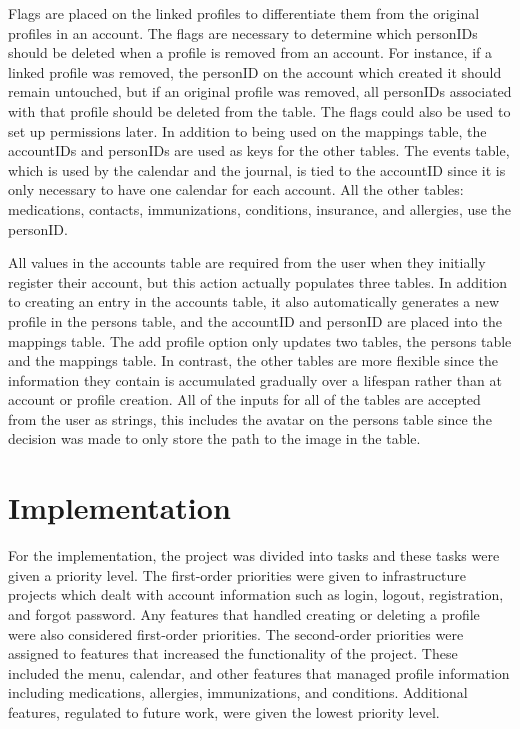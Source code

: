 \documentclass[twocolumn,12pt]{article}
\begin{document}
Flags are placed on the linked profiles to differentiate them from the original profiles in an account. The flags are necessary to determine which personIDs should be deleted when a profile is removed from an account. For instance, if a linked profile was removed, the personID on the account which created it should remain untouched, but if an original profile was removed, all personIDs associated with that profile should be deleted from the table. The flags could also be used to set up permissions later. In addition to being used on the mappings table, the accountIDs and personIDs are used as keys for the other tables. The events table, which is used by the calendar and the journal, is tied to the accountID since it is only necessary to have one calendar for each account. All the other tables: medications, contacts, immunizations, conditions, insurance, and allergies, use the personID.

All values in the accounts table are required from the user when they initially register their account, but this action actually populates three tables. In addition to creating an entry in the accounts table, it also automatically generates a new profile in the persons table, and the accountID and personID are placed into the mappings table. The add profile option only updates two tables, the persons table and the mappings table. In contrast, the other tables are more flexible since the information they contain is accumulated gradually over a lifespan rather than at account or profile creation. All of the inputs for all of the tables are accepted from the user as strings, this includes the avatar on the persons table since the decision was made to only store the path to the image in the table.

\section{Implementation}
For the implementation, the project was divided into tasks and these tasks were given a priority level. The first-order priorities were given to infrastructure projects which dealt with account information such as login, logout, registration, and forgot password. Any features that handled creating or deleting a profile were also considered first-order priorities. The second-order priorities were assigned to features that increased the functionality of the project. These included the menu, calendar, and other features that managed profile information including medications, allergies, immunizations, and conditions. Additional features, regulated to future work, were given the lowest priority level.
\end{document}
